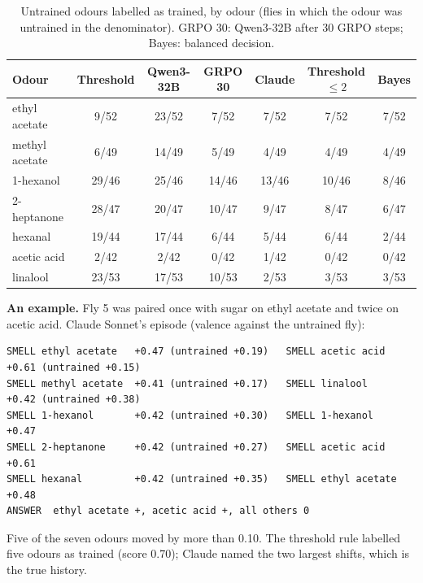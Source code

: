 \begin{table}[h]
\centering
\caption{Untrained odours labelled as trained, by odour (flies in which the odour was untrained in the denominator). GRPO 30: Qwen3-32B after 30 GRPO steps; Bayes: balanced decision.}
\label{tab:errorsodour}
\footnotesize
\begin{tabular}{lcccccc}
\toprule
Odour & Threshold & Qwen3-32B & GRPO 30 & Claude & Threshold $\le 2$ & Bayes \\
\midrule
ethyl acetate & 9/52 & 23/52 & 7/52 & 7/52 & 7/52 & 7/52 \\
methyl acetate & 6/49 & 14/49 & 5/49 & 4/49 & 4/49 & 4/49 \\
1-hexanol & 29/46 & 25/46 & 14/46 & 13/46 & 10/46 & 8/46 \\
2-heptanone & 28/47 & 20/47 & 10/47 & 9/47 & 8/47 & 6/47 \\
hexanal & 19/44 & 17/44 & 6/44 & 5/44 & 6/44 & 2/44 \\
acetic acid & 2/42 & 2/42 & 0/42 & 1/42 & 0/42 & 0/42 \\
linalool & 23/53 & 17/53 & 10/53 & 2/53 & 3/53 & 3/53 \\
\bottomrule
\end{tabular}
\end{table}

\textbf{An example.} Fly 5 was paired once with sugar on ethyl acetate and twice on acetic acid. Claude Sonnet's episode (valence against the untrained fly):
{\scriptsize
\begin{verbatim}
SMELL ethyl acetate   +0.47 (untrained +0.19)   SMELL acetic acid     +0.61 (untrained +0.15)
SMELL methyl acetate  +0.41 (untrained +0.17)   SMELL linalool        +0.42 (untrained +0.38)
SMELL 1-hexanol       +0.42 (untrained +0.30)   SMELL 1-hexanol       +0.47
SMELL 2-heptanone     +0.42 (untrained +0.27)   SMELL acetic acid     +0.61
SMELL hexanal         +0.42 (untrained +0.35)   SMELL ethyl acetate   +0.48
ANSWER  ethyl acetate +, acetic acid +, all others 0
\end{verbatim}}
\noindent Five of the seven odours moved by more than 0.10. The threshold rule labelled five odours as trained (score 0.70); Claude named the two largest shifts, which is the true history.

